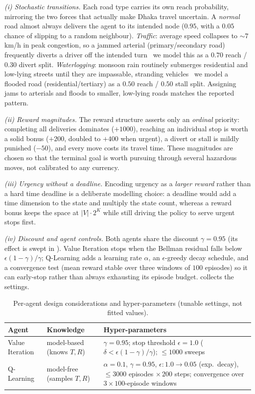 \documentclass{ai-lab-report}
\begin{document}
\emph{(i) Stochastic transitions.} Each road type carries its own reach probability, mirroring the two forces that actually make Dhaka travel uncertain. A \emph{normal} road almost always delivers the agent to its intended node ($0.95$, with a $0.05$ chance of slipping to a random neighbour). \emph{Traffic}: average speed collapses to ${\sim}7$\,km/h in peak congestion, so a jammed arterial (primary/secondary road) frequently diverts a driver off the intended turn~\citep{worldbank2018dhaka,dailystar2018congestion}  we model this as a $0.70$ reach / $0.30$ divert split. \emph{Waterlogging}: monsoon rain routinely submerges residential and low-lying streets until they are impassable, stranding vehicles~\citep{dailystar2025waterlogging}  we model a flooded road (residential/tertiary) as a $0.50$ reach / $0.50$ stall split. Assigning jams to arterials and floods to smaller, low-lying roads matches the reported pattern.

\emph{(ii) Reward magnitudes.} The reward structure asserts only an \emph{ordinal} priority: completing all deliveries dominates ($+1000$), reaching an individual stop is worth a solid bonus ($+200$, doubled to $+400$ when urgent), a divert or stall is mildly punished ($-50$), and every move costs its travel time. These magnitudes are chosen so that the terminal goal is worth pursuing through several hazardous moves, not calibrated to any currency.

\emph{(iii) Urgency without a deadline.} Encoding urgency as a \emph{larger reward} rather than a hard time deadline is a deliberate modelling choice: a deadline would add a time dimension to the state and multiply the state count, whereas a reward bonus keeps the space at $|V|\cdot2^{K}$ while still driving the policy to serve urgent stops first.

\emph{(iv) Discount and agent controls.} Both agents share the discount $\gamma=0.95$ (its effect is swept in ). Value Iteration stops when the Bellman residual falls below $\epsilon(1{-}\gamma)/\gamma$; Q-Learning adds a learning rate $\alpha$, an $\epsilon$-greedy decay schedule, and a convergence test (mean reward stable over three windows of $100$ episodes) so it can early-stop rather than always exhausting its episode budget.  collects the settings.

\begin{table}[H]
\centering
\small
\begin{tabularx}{\linewidth}{@{}lXX@{}}
\toprule
Agent & Knowledge & Hyper-parameters \\
\midrule
Value Iteration & model-based (knows $T,R$) & $\gamma{=}0.95$; stop threshold $\epsilon{=}1.0$ ($\delta<\epsilon(1{-}\gamma)/\gamma$); $\le1000$ sweeps \\
Q-Learning & model-free (samples $T,R$) & $\alpha{=}0.1$, $\gamma{=}0.95$, $\epsilon:1.0\!\to\!0.05$ (exp.\ decay), $\le3000$ episodes $\times\,200$ steps; convergence over $3{\times}100$-episode windows \\
\bottomrule
\end{tabularx}
\caption{Per-agent design considerations and hyper-parameters (tunable settings, not fitted values).}
\label{tab:a4hyper}
\end{table}
\end{document}
